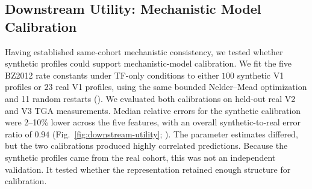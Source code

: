 \subsection{Downstream Utility: Mechanistic Model Calibration}
\label{sec:results-utility}

Having established same-cohort mechanistic consistency, we tested whether synthetic profiles
could support mechanistic-model calibration. We fit the
five BZ2012 rate constants under TF-only conditions to either $100$ synthetic V1 profiles or
$23$ real V1 profiles, using the same bounded Nelder--Mead optimization and 11 random restarts
(). We evaluated both calibrations on held-out real V2 and V3
TGA measurements. Median relative errors for the synthetic calibration were 2--10\% lower
across the five features, with an overall synthetic-to-real error ratio of $0.94$
(Fig.~\ref{fig:downstream-utility}; ). The parameter
estimates differed, but the two calibrations produced highly correlated predictions. Because
the synthetic profiles came from the real cohort, this was not an independent validation. It
tested whether the representation retained enough structure for calibration.
 
